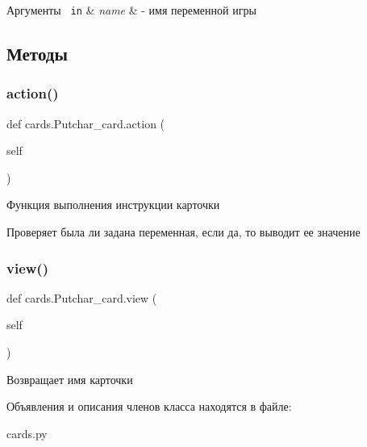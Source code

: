\begin{DoxyParams}[1]{Аргументы}
\mbox{\texttt{ in}}  & {\em name} & -\/ имя переменной игры \\
\hline
\end{DoxyParams}


\subsection{Методы}
\mbox{\label{classcards_1_1_putchar__card_a38fd4a6f472b122e8450a5cd18939797}} 
\subsubsection{\texorpdfstring{action()}{action()}}
{\footnotesize\ttfamily def cards.\+Putchar\+\_\+card.\+action (\begin{DoxyParamCaption}\item[{}]{self }\end{DoxyParamCaption})}



Функция выполнения инструкции карточки 

Проверяет была ли задана переменная, если да, то выводит ее значение \mbox{\label{classcards_1_1_putchar__card_aada8fcd8665a53606210e983a3eb1e2d}} 
\subsubsection{\texorpdfstring{view()}{view()}}
{\footnotesize\ttfamily def cards.\+Putchar\+\_\+card.\+view (\begin{DoxyParamCaption}\item[{}]{self }\end{DoxyParamCaption})}



Возвращает имя карточки 



Объявления и описания членов класса находятся в файле\+:\begin{DoxyCompactItemize}
\item 
cards.\+py\end{DoxyCompactItemize}
